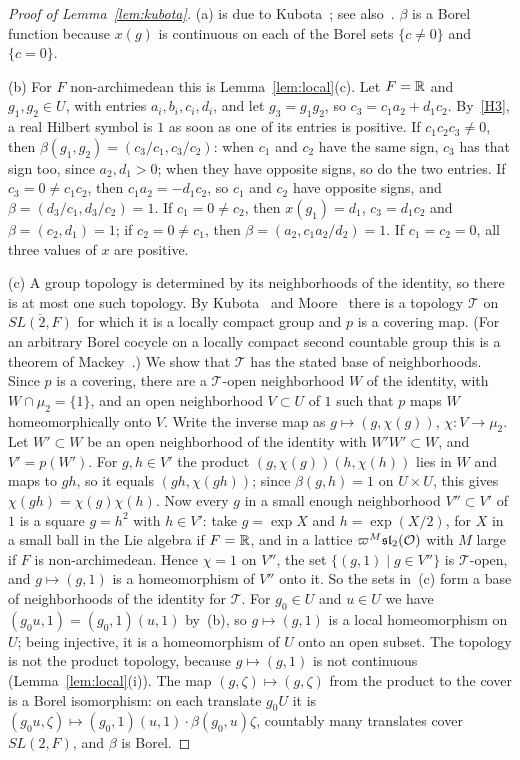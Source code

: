 \begin{proof}[Proof of Lemma~\ref{lem:kubota}]
(a) is due to Kubota~\cite{Ku67}; see also~\cite{Ku69,Ge76}. $\beta$ is a
Borel function because $x(g)$ is continuous on each of the Borel sets
$\{c\ne0\}$ and $\{c=0\}$.

(b) For $F$ non-archimedean this is Lemma~\ref{lem:local}(c). Let
$F=\mathbb{R}$ and $g_1,g_2\in U$, with entries $a_i,b_i,c_i,d_i$, and let
$g_3=g_1g_2$, so $c_3=c_1a_2+d_1c_2$. By~\ref{H3}, a real Hilbert symbol is
$1$ as soon as one of its entries is positive. If $c_1c_2c_3\ne0$, then
$\beta(g_1,g_2)=(c_3/c_1,c_3/c_2)$: when $c_1$ and $c_2$ have the same
sign, $c_3$ has that sign too, since $a_2,d_1>0$; when they have opposite
signs, so do the two entries. If $c_3=0\ne c_1c_2$, then
$c_1a_2=-d_1c_2$, so $c_1$ and $c_2$ have opposite signs, and
$\beta=(d_3/c_1,d_3/c_2)=1$. If $c_1=0\ne c_2$, then $x(g_1)=d_1$,
$c_3=d_1c_2$ and $\beta=(c_2,d_1)=1$; if $c_2=0\ne c_1$, then
$\beta=(a_2,c_1a_2/d_2)=1$. If $c_1=c_2=0$, all three values of $x$ are
positive.

(c) A group topology is determined by its neighborhoods of the identity,
so there is at most one such topology. By Kubota~\cite{Ku67} and
Moore~\cite{Mo68} there is a topology $\mathcal T$ on $\overline{SL(2,F)}$
for which it is a locally compact group and $p$ is a covering map. (For
an arbitrary Borel cocycle on a locally compact second countable group
this is a theorem of Mackey~\cite{Ma57}.) We show that $\mathcal T$ has
the stated base of neighborhoods. Since $p$ is a covering, there are a
$\mathcal T$-open neighborhood $W$ of the identity, with
$W\cap\mu_2=\{1\}$, and an open neighborhood $V\subset U$ of $1$ such
that $p$ maps $W$ homeomorphically onto $V$. Write the inverse map as
$g\mapsto(g,\chi(g))$, $\chi\colon V\to\mu_2$. Let $W'\subset W$ be an open
neighborhood of the identity with $W'W'\subset W$, and $V'=p(W')$. For
$g,h\in V'$ the product $(g,\chi(g))(h,\chi(h))$ lies in $W$ and maps to
$gh$, so it equals $(gh,\chi(gh))$; since $\beta(g,h)=1$ on $U\times U$,
this gives $\chi(gh)=\chi(g)\chi(h)$. Now every $g$ in a small enough
neighborhood $V''\subset V'$ of $1$ is a square $g=h^2$ with $h\in V'$:
take $g=\exp X$ and $h=\exp(X/2)$, for $X$ in a small ball in the Lie
algebra if $F=\mathbb{R}$, and in a lattice $\varpi^M\mathfrak{sl}_2(\mathcal{O})$ with
$M$ large if $F$ is non-archimedean. Hence $\chi=1$ on $V''$, the set
$\{(g,1)\mid g\in V''\}$ is $\mathcal T$-open, and $g\mapsto(g,1)$ is a
homeomorphism of $V''$ onto it. So the sets in~(c) form a base of
neighborhoods of the identity for $\mathcal T$. For $g_0\in U$ and
$u\in U$ we have $(g_0u,1)=(g_0,1)(u,1)$ by~(b), so $g\mapsto(g,1)$ is a
local homeomorphism on $U$; being injective, it is a homeomorphism of $U$
onto an open subset. The topology is not the product topology, because
$g\mapsto(g,1)$ is not continuous (Lemma~\ref{lem:local}(i)). The map
$(g,\zeta)\mapsto(g,\zeta)$ from the product to the cover is a Borel
isomorphism: on each translate $g_0U$ it is $(g_0u,\zeta)\mapsto
(g_0,1)(u,1)\cdot\beta(g_0,u)\zeta$, countably many translates cover
$SL(2,F)$, and $\beta$ is Borel.
\end{proof}

